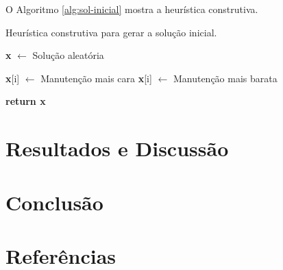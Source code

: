 \documentclass[
	12pt,				%
	oneside,			%
	a4paper,			%
	chapter=TITLE,
	sumario=tradicional,
	english,			%
	brazil				%
]{abntex2}
\begin{document}
O Algoritmo \ref{alg:sol-inicial} mostra a heurística construtiva.

\begin{algorithm}[H]
	\caption{Heurística construtiva para gerar a solução inicial.}\label{alg:sol-inicial}
	\begin{algorithmic}[1]

	\State \textbf{x} $\gets$ Solução aleatória

			\State \textbf{x}[i] $\gets$ Manutenção mais cara
		\Else
			\State \textbf{x}[i] $\gets$ Manutenção mais barata
		\EndIf
	\EndFor
	   
	\Statex
	\State \textbf{return x} 
	\EndProcedure 
	\end{algorithmic}
\end{algorithm}


\chapter{Resultados e Discussão}\label{cap:resultados} 



\chapter{Conclusão}\label{cap:conclusao} 


\chapter{Referências}\label{cap:referencias} 
\end{document}

